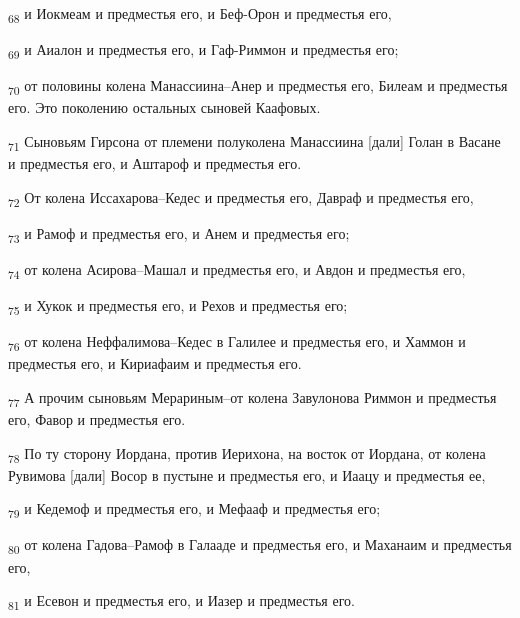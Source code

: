 \begin{tcolorbox}
\textsubscript{68} и Иокмеам и предместья его, и Беф-Орон и предместья его,
\end{tcolorbox}
\begin{tcolorbox}
\textsubscript{69} и Аиалон и предместья его, и Гаф-Риммон и предместья его;
\end{tcolorbox}
\begin{tcolorbox}
\textsubscript{70} от половины колена Манассиина--Анер и предместья его, Билеам и предместья его. Это поколению остальных сыновей Каафовых.
\end{tcolorbox}
\begin{tcolorbox}
\textsubscript{71} Сыновьям Гирсона от племени полуколена Манассиина [дали] Голан в Васане и предместья его, и Аштароф и предместья его.
\end{tcolorbox}
\begin{tcolorbox}
\textsubscript{72} От колена Иссахарова--Кедес и предместья его, Давраф и предместья его,
\end{tcolorbox}
\begin{tcolorbox}
\textsubscript{73} и Рамоф и предместья его, и Анем и предместья его;
\end{tcolorbox}
\begin{tcolorbox}
\textsubscript{74} от колена Асирова--Машал и предместья его, и Авдон и предместья его,
\end{tcolorbox}
\begin{tcolorbox}
\textsubscript{75} и Хукок и предместья его, и Рехов и предместья его;
\end{tcolorbox}
\begin{tcolorbox}
\textsubscript{76} от колена Неффалимова--Кедес в Галилее и предместья его, и Хаммон и предместья его, и Кириафаим и предместья его.
\end{tcolorbox}
\begin{tcolorbox}
\textsubscript{77} А прочим сыновьям Мерариным--от колена Завулонова Риммон и предместья его, Фавор и предместья его.
\end{tcolorbox}
\begin{tcolorbox}
\textsubscript{78} По ту сторону Иордана, против Иерихона, на восток от Иордана, от колена Рувимова [дали] Восор в пустыне и предместья его, и Иаацу и предместья ее,
\end{tcolorbox}
\begin{tcolorbox}
\textsubscript{79} и Кедемоф и предместья его, и Мефааф и предместья его;
\end{tcolorbox}
\begin{tcolorbox}
\textsubscript{80} от колена Гадова--Рамоф в Галааде и предместья его, и Маханаим и предместья его,
\end{tcolorbox}
\begin{tcolorbox}
\textsubscript{81} и Есевон и предместья его, и Иазер и предместья его.
\end{tcolorbox}
